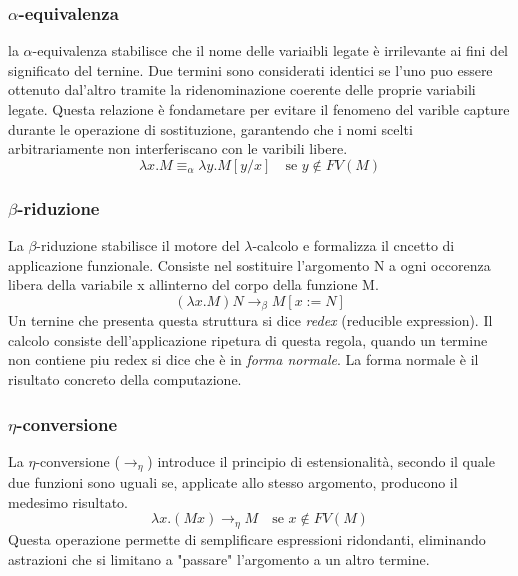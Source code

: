 
\subsubsection{\texorpdfstring{$\alpha$}{alpha}-equivalenza}
la $\alpha$-equivalenza stabilisce che il nome delle variaibli legate è irrilevante ai fini del significato del ternine. Due termini sono considerati 
identici se l'uno puo essere ottenuto dal'altro tramite la ridenominazione coerente delle proprie variabili legate. Questa relazione è fondametare per 
evitare il fenomeno del varible capture durante le operazione di sostituzione, garantendo che i nomi scelti arbitrariamente non interferiscano con 
le varibili libere.
\begin{equation}
    \lambda x. M \equiv_\alpha \lambda y. M[y/x] \quad \text{se } y \notin FV(M)
    \label{eq:alpha_conversion}
\end{equation}

\subsubsection{\texorpdfstring{$\beta$}{beta}-riduzione}
\label{sec:beta_reduction}
La $\beta$-riduzione stabilisce il motore del $\lambda$-calcolo e formalizza il cncetto di applicazione funzionale. Consiste nel sostituire l'argomento N a ogni
occorenza libera della variabile x allinterno del corpo della funzione M.
\begin{equation}
    (\lambda x. M) N \to_\beta M[x := N]
    \label{eq:beta_reduction}
\end{equation}
Un ternine che presenta questa struttura si dice \emph{redex} (reducible expression). Il calcolo consiste dell'applicazione ripetura di questa regola, 
quando un termine non contiene piu redex si dice che è in \emph{forma normale}. La forma normale è il risultato concreto della computazione.

\subsubsection{\texorpdfstring{$\eta$}{eta}-conversione}
La $\eta$-conversione ($\to_\eta$) introduce il principio di estensionalità, secondo il quale due funzioni sono uguali se, 
applicate allo stesso argomento, producono il medesimo risultato.
\begin{equation}
    \lambda x. (M x) \to_\eta M \quad \text{se } x \notin FV(M)
    \label{eq:eta_conversion}
\end{equation}
Questa operazione permette di semplificare espressioni ridondanti, eliminando astrazioni che si limitano a "passare" 
l'argomento a un altro termine.

